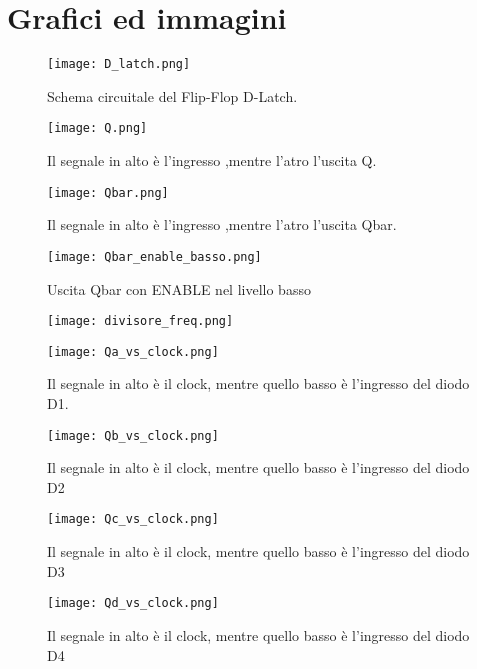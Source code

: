 \section{Grafici ed immagini}

\begin{figure}[h]
	\centering
	\texttt{[image: D\_latch.png]}
	\caption{Schema circuitale del Flip-Flop D-Latch.}
	\label{f:D-Latch}
\end{figure}

\begin{figure}[h]
	\centering
	\texttt{[image: Q.png]}
	\caption{Il segnale in alto è l'ingresso ,mentre l'atro l'uscita Q.}
	\label{f:Q}
\end{figure}

\begin{figure}[h]
	\centering
	\texttt{[image: Qbar.png]}
	\caption{Il segnale in alto è l'ingresso ,mentre l'atro l'uscita Qbar.}
	\label{f:Qbar}
\end{figure}

\begin{figure}[h]
	\centering
	\texttt{[image: Qbar\_enable\_basso.png]}
	\caption{Uscita Qbar con ENABLE nel livello basso}
	\label{f:Qbar_enable_basso}
\end{figure}

\begin{figure}[h]
	\centering
	\texttt{[image: divisore\_freq.png]}
	\caption{}
	\label{f:contatore}
\end{figure}

\begin{figure}[h]
	\centering
	\texttt{[image: Qa\_vs\_clock.png]}
	\caption{Il segnale in alto è il clock, mentre quello basso è  l'ingresso del diodo D1.}
	\label{f:Qa_vs_clock}
\end{figure}

\begin{figure}[h]
	\centering
	\texttt{[image: Qb\_vs\_clock.png]}
	\caption{Il segnale in alto è il clock, mentre quello basso è  l'ingresso del diodo D2}
	\label{f:Qb_vs_clock}
\end{figure}

\begin{figure}[h]
	\centering
	\texttt{[image: Qc\_vs\_clock.png]}
	\caption{Il segnale in alto è il clock, mentre quello basso è  l'ingresso del diodo D3}
	\label{f:Qc_vs_clock}
\end{figure}

\begin{figure}[h]
	\centering
	\texttt{[image: Qd\_vs\_clock.png]}
	\caption{Il segnale in alto è il clock, mentre quello basso è  l'ingresso del diodo D4}
	\label{f:Qd_vs_clock}
\end{figure}

